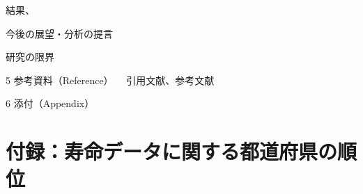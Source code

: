 \documentclass[a4j,11pt,mc]{jreport}
\begin{document}
結果、

今後の展望・分析の提言

研究の限界



5 参考資料（Reference）
 　引用文献、参考文献

6 添付（Appendix）




\chapter*{付録：寿命データに関する都道府県の順位}













\newpage
\makeatletter
\renewcommand{\@biblabel}[1]{[#1]}
\makeatother



\end{document}
